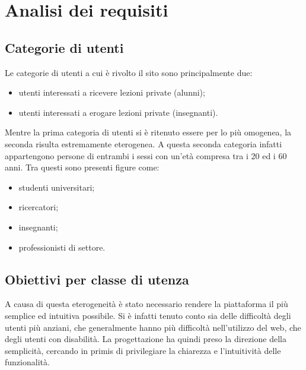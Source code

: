 \documentclass[12pt]{article}
\begin{document}
\section{Analisi dei requisiti}

\subsection{Categorie di utenti}
Le categorie di utenti a cui \`e rivolto il sito sono principalmente due:
\begin{itemize}
	\item utenti interessati a ricevere lezioni private (alunni);
	\item utenti interessati a erogare lezioni private (insegnanti).
\end{itemize}
Mentre la prima categoria di utenti si \`e ritenuto essere per lo pi\`u omogenea, la seconda risulta estremamente eterogenea. A questa seconda categoria infatti appartengono persone di entrambi i sessi con un'et\`a compresa tra i 20 ed i 60 anni. Tra questi sono presenti figure come:

\begin{itemize}
	\item studenti universitari;
	\item ricercatori;
	\item insegnanti;
	\item professionisti di settore.
\end{itemize}

\subsection{Obiettivi per classe di utenza}
A causa di questa eterogeneit\`a \`e stato necessario rendere la piattaforma il pi\`u semplice ed intuitiva possibile. Si \`e infatti tenuto conto sia delle difficolt\`a degli utenti pi\`u anziani, che generalmente hanno pi\`u difficolt\`a nell'utilizzo del web, che degli utenti con disabilit\`a. La progettazione ha quindi preso la direzione della semplicit\`a, cercando in primis di privilegiare la chiarezza e l'intuitivit\`a delle funzionalit\`a.
\end{document}
